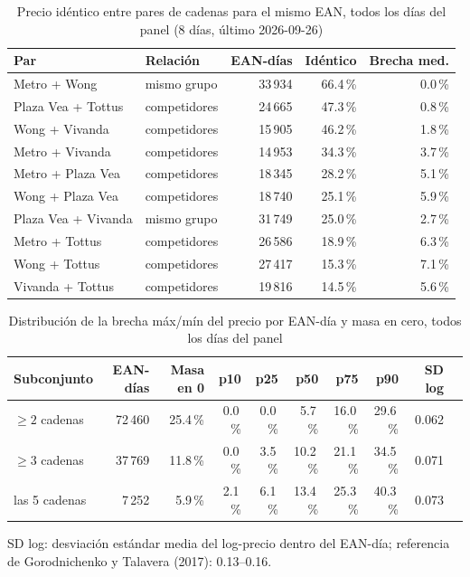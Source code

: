 
\begin{table}[htbp]
\caption{Precio id\'entico entre pares de cadenas para el mismo EAN, todos los d\'ias del panel (8 d\'ias, \'ultimo 2026-09-26)}
\label{tab:identidad}
\centering\scriptsize\setlength{\tabcolsep}{3pt}
\begin{tabular}{@{}llrrr@{}}
\toprule
Par & Relaci\'on & EAN-d\'ias & Id\'entico & Brecha med. \\
\midrule
Metro + Wong & mismo grupo & 33\,934 & 66.4\,\% & 0.0\,\% \\
Plaza Vea + Tottus & competidores & 24\,665 & 47.3\,\% & 0.8\,\% \\
Wong + Vivanda & competidores & 15\,905 & 46.2\,\% & 1.8\,\% \\
Metro + Vivanda & competidores & 14\,953 & 34.3\,\% & 3.7\,\% \\
Metro + Plaza Vea & competidores & 18\,345 & 28.2\,\% & 5.1\,\% \\
Wong + Plaza Vea & competidores & 18\,740 & 25.1\,\% & 5.9\,\% \\
Plaza Vea + Vivanda & mismo grupo & 31\,749 & 25.0\,\% & 2.7\,\% \\
Metro + Tottus & competidores & 26\,586 & 18.9\,\% & 6.3\,\% \\
Wong + Tottus & competidores & 27\,417 & 15.3\,\% & 7.1\,\% \\
Vivanda + Tottus & competidores & 19\,816 & 14.5\,\% & 5.6\,\% \\
\bottomrule\end{tabular}\end{table}

\begin{table}[t]
\caption{Distribuci\'on de la brecha m\'ax/m\'in del precio por EAN-d\'ia y masa en cero, todos los d\'ias del panel}
\label{tab:brecha}
\centering\scriptsize\setlength{\tabcolsep}{4pt}
\begin{tabular}{@{}lrrrrrrrrr@{}}
\toprule
Subconjunto & EAN-d\'ias & Masa en 0 & p10 & p25 & p50 & p75 & p90 & SD log \\
\midrule
$\geq 2$ cadenas & 72\,460 & 25.4\,\% & 0.0\,\% & 0.0\,\% & 5.7\,\% & 16.0\,\% & 29.6\,\% & 0.062 \\
$\geq 3$ cadenas & 37\,769 & 11.8\,\% & 0.0\,\% & 3.5\,\% & 10.2\,\% & 21.1\,\% & 34.5\,\% & 0.071 \\
las 5 cadenas & 7\,252 & 5.9\,\% & 2.1\,\% & 6.1\,\% & 13.4\,\% & 25.3\,\% & 40.3\,\% & 0.073 \\
\bottomrule\end{tabular}
\par\smallskip\raggedright\scriptsize SD log: desviaci\'on est\'andar media del log-precio dentro del EAN-d\'ia; referencia de Gorodnichenko y Talavera (2017): 0.13--0.16.
\end{table}

